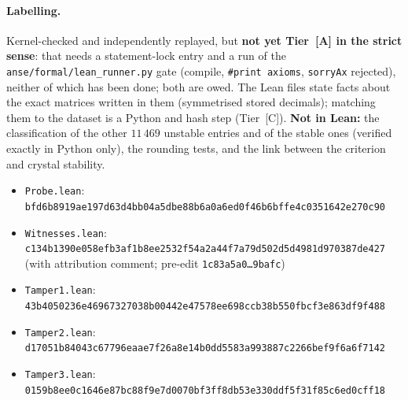 \documentclass[10pt]{article}
\newcommand{\tier}[1]{\textsf{[#1]}}
\newcommand{\tA}{\tier{A}}
\newcommand{\tC}{\tier{C}}
\newcommand{\lean}[1]{\texttt{#1}}
\begin{document}
\paragraph{Labelling.} Kernel-checked and independently replayed, but \textbf{not yet Tier~\tA{} in the strict sense}: that needs a statement-lock entry and a run of the \texttt{anse/formal/lean\_runner.py} gate (compile, \texttt{\#print axioms}, \lean{sorryAx} rejected), neither of which has been done; both are owed. The Lean files state facts about the exact matrices written in them (symmetrised stored decimals); matching them to the dataset is a Python and hash step (Tier~\tC). \textbf{Not in Lean:} the classification of the other $11\,469$ unstable entries and of the stable ones (verified exactly in Python only), the rounding tests, and the link between the criterion and crystal stability.
\begin{itemize}\scriptsize\itemsep=0pt
\item \texttt{Probe.lean}: \texttt{bfd6b8919ae197d63d4bb04a5dbe88b6a0a6ed0f46b6bffe4c0351642e270c90}
\item \texttt{Witnesses.lean}: \texttt{c134b1390e058efb3af1b8ee2532f54a2a44f7a79d502d5d4981d970387de427} (with attribution comment; pre-edit \texttt{1c83a5a0\dots9bafc})
\item \texttt{Tamper1.lean}: \texttt{43b4050236e46967327038b00442e47578ee698ccb38b550fbcf3e863df9f488}
\item \texttt{Tamper2.lean}: \texttt{d17051b84043c67796eaae7f26a8e14b0dd5583a993887c2266bef9f6a6f7142}
\item \texttt{Tamper3.lean}: \texttt{0159b8ee0c1646e87bc88f9e7d0070bf3ff8db53e330ddf5f31f85c6ed0cff18}
\end{itemize}

\end{document}
